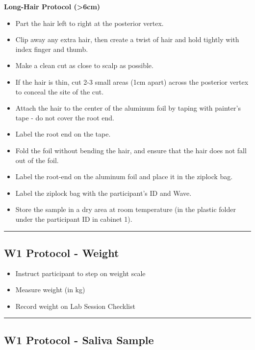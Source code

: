 \documentclass[]{book}
\providecommand{\tightlist}{%
  \setlength{\itemsep}{0pt}\setlength{\parskip}{0pt}}
\begin{document}
\textbf{Long-Hair Protocol (\textgreater{}6cm)}

\begin{itemize}
\tightlist
\item
  Part the hair left to right at the posterior vertex.
\item
  Clip away any extra hair, then create a twist of hair and hold tightly with index finger and thumb.
\item
  Make a clean cut as close to scalp as possible.
\item
  If the hair is thin, cut 2-3 small areas (1cm apart) across the posterior vertex to conceal the site of the cut.
\item
  Attach the hair to the center of the aluminum foil by taping with painter's tape - do not cover the root end.
\item
  Label the root end on the tape.
\item
  Fold the foil without bending the hair, and ensure that the hair does not fall out of the foil.
\item
  Label the root-end on the aluminum foil and place it in the ziplock bag.
\item
  Label the ziplock bag with the participant's ID and Wave.
\item
  Store the sample in a dry area at room temperature (in the plastic folder under the participant ID in cabinet 1).
\end{itemize}

\begin{center}\rule{0.5\linewidth}{0.5pt}\end{center}

\hypertarget{w1-protocol---weight}{%
\subsection{W1 Protocol - Weight}\label{w1-protocol---weight}}

\begin{itemize}
\tightlist
\item
  Instruct participant to step on weight scale
\item
  Measure weight (in kg)
\item
  Record weight on Lab Session Checklist
\end{itemize}

\begin{center}\rule{0.5\linewidth}{0.5pt}\end{center}

\hypertarget{w1-protocol---saliva-sample}{%
\subsection{W1 Protocol - Saliva Sample}\label{w1-protocol---saliva-sample}}
\end{document}
